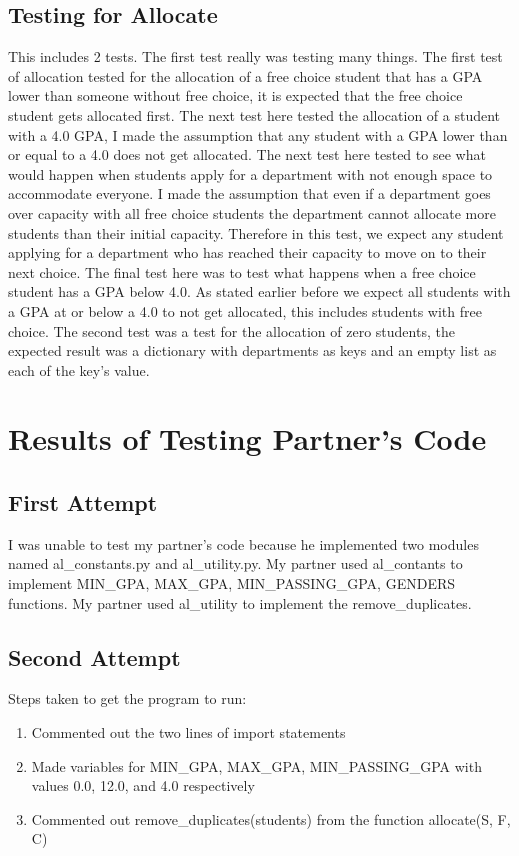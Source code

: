 \documentclass[12pt]{article}
\begin{document}
\subsection {Testing for Allocate}

This includes 2 tests. The first test really was testing many things. The first test of allocation tested for the allocation of a free choice
student that has a GPA lower than someone without free choice, it is expected that the free choice student gets allocated first.
The next test here tested the allocation of a student with a 4.0 GPA, I made the assumption that any student with a GPA lower than or equal to 
a 4.0 does not get allocated. The next test here tested to see what would happen when students apply for a department with not enough space to 
accommodate everyone. I made the assumption that even if a department goes over capacity with all free choice students the department cannot 
allocate more students than their initial capacity. Therefore in this test, we expect any student applying for a department who has reached their 
capacity to move on to their next choice. The final test here was to test what happens when a free choice student has a GPA below 4.0. As stated
earlier before we expect all students with a GPA at or below a 4.0 to not get allocated, this includes students with free choice.
The second test was a test for the allocation of zero students, the expected result was a dictionary with departments as keys and an empty list
as each of the key's value.

\section{Results of Testing Partner's Code}

\subsection{First Attempt}

I was unable to test my partner's code because he implemented two modules named al\_constants.py and al\_utility.py.
My partner used al\_contants to implement MIN\_GPA, MAX\_GPA, MIN\_PASSING\_GPA, GENDERS functions.
My partner used al\_utility to implement the remove\_duplicates.


\subsection{Second Attempt}
Steps taken to get the program to run:
\begin{enumerate}

\item Commented out the two lines of import statements
\item Made variables for MIN\_GPA, MAX\_GPA, MIN\_PASSING\_GPA with values 0.0, 12.0, and 4.0 respectively
\item Commented out remove\_duplicates(students) from the function allocate(S, F, C)

\end{enumerate}
\end{document}
